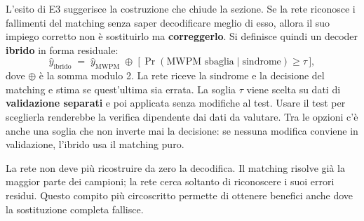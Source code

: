 L'esito di E3 suggerisce la costruzione che chiude la sezione. Se la rete riconosce i fallimenti del matching senza saper decodificare meglio di esso, allora il suo impiego corretto non è sostituirlo ma \textbf{correggerlo}. Si definisce quindi un decoder \textbf{ibrido} in forma residuale:
\begin{equation}
    \hat{y}_{\text{ibrido}} \;=\; \hat{y}_{\text{MWPM}} \;\oplus\; \big[\, \Pr(\text{MWPM sbaglia} \mid \text{sindrome}) \geq \tau \,\big],
    \label{eq:decoder_ibrido}
\end{equation}
dove $\oplus$ è la somma modulo 2. La rete riceve la sindrome e la decisione del matching e stima se quest'ultima sia errata. La soglia $\tau$ viene scelta su dati di \textbf{validazione separati} e poi applicata senza modifiche al test. Usare il test per sceglierla renderebbe la verifica dipendente dai dati da valutare. Tra le opzioni c'è anche una soglia che non inverte mai la decisione: se nessuna modifica conviene in validazione, l'ibrido usa il matching puro.

La rete non deve più ricostruire da zero la decodifica. Il matching risolve già la maggior parte dei campioni; la rete cerca soltanto di riconoscere i suoi errori residui. Questo compito più circoscritto permette di ottenere benefici anche dove la sostituzione completa fallisce.

